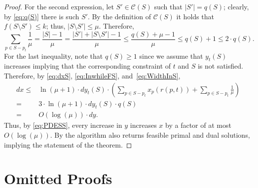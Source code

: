 \documentclass[11pt]{article}
\newcommand{\cC}{{\mathcal{C}}}
\begin{document}
\begin{proof}
	For the second expression, let $S' \in \cC(S)$ such that $|S'| = q(S)$; clearly, by \eqref{eq:q(S)} there is such $S'$. By the definition of $\cC(S)$ it holds that $f(S \setminus S') \leq k$; thus, $|S \setminus S'| \leq \mu$. Therefore,  
	\begin{equation}
		\label{eq:WidthInS}
		\sum_{p \in S-p_t} \frac{1}{\mu} = \frac{ \left| S \right|-1}{\mu} = \frac{ \left| S' \right|+\left|S \setminus S'\right|-1}{\mu} \leq \frac{ q(S)+\mu-1}{\mu} \leq q(S)+1 \leq 2 \cdot q(S).  
	\end{equation} For the last inequality, note that $q(S) \geq 1$ since we assume that $y_t(S)$ increases implying that the corresponding constraint of $t$ and $S$ is not satisfied. Therefore, by \eqref{eq:dxS}, \eqref{eq:InwhileFS}, and~\eqref{eq:WidthInS},
	\begin{equation}
		\label{eq:PDESS}
		\begin{aligned}
			dx \leq{} &  \ln \left(\mu+1 \right) \cdot d y_t(S) \cdot  \left(	\sum_{p \in S-p_t} x_p(r(p,t)) + 	\sum_{p \in S-p_t} \frac{1}{\mu} \right) \\
			={} & 3 \cdot \ln \left(\mu+1 \right) \cdot d y_t(S) \cdot q(S)\\
			={} & O(\log (\mu)) \cdot dy.
		\end{aligned}
	\end{equation} Thus, by \eqref{eq:PDESS}, every increase in $y$ increases $x$ by a factor of at most $O(\log (\mu))$. By  the algorithm also returns feasible primal and dual solutions, implying the statement of the theorem.  
\end{proof}

\section{Omitted Proofs}
\label{sec:omit}
\end{document}

